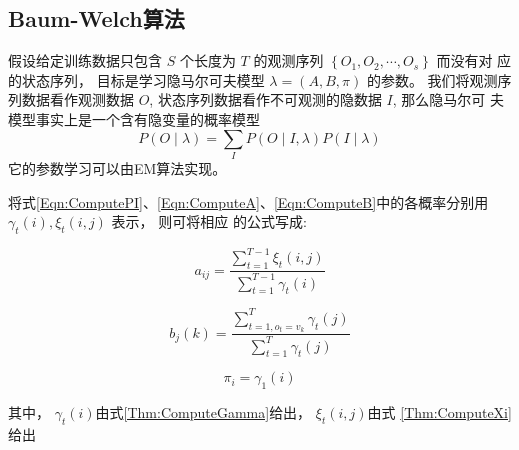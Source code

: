 \subsection{Baum-Welch算法}

假设给定训练数据只包含 $ S $ 个长度为 $ T $ 的观测序列 $ \left\{O_{1}, O_{2}, \cdots, O_{s}\right\} $ 而没有对 应的状态序列， 目标是学习隐马尔可夫模型 $ \lambda=(A, B, \pi) $ 的参数。 我们将观测序列数据看作观测数据 $ O $, 状态序列数据看作不可观测的隐数据 $ I $, 那么隐马尔可 夫模型事实上是一个含有隐变量的概率模型
\begin{equation}
P(O \mid \lambda)=\sum_{I} P(O \mid I, \lambda) P(I \mid \lambda)
\end{equation}
它的参数学习可以由EM算法实现。 

\begin{theorem}
    将式\ref{Eqn:ComputePI}、\ref{Eqn:ComputeA}、\ref{Eqn:ComputeB}中的各概率分别用 $ \gamma_{t}(i), \xi_{t}(i, j) $ 表示， 则可将相应 的公式写成:

    \begin{equation} a_{i j}=\frac{\sum_{t=1}^{T-1} \xi_{t}(i, j)}{\sum_{t=1}^{T-1} \gamma_{t}(i)} \end{equation}

    \begin{equation} b_{j}(k)=\frac{\sum_{t=1, o_{t}=v_{k}}^{T} \gamma_{t}(j)}{\sum_{t=1}^{T} \gamma_{t}(j)} \end{equation}

    \begin{equation} \pi_{i}=\gamma_{1}(i) \end{equation}

    其中， $ \gamma_{t}(i)$由式\ref{Thm:ComputeGamma}给出， $\xi_{t}(i, j) $由式 \ref{Thm:ComputeXi} 给出
\end{theorem}


